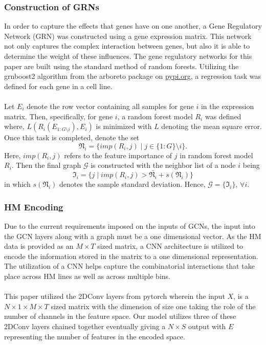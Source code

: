 \subsubsection{Construction of GRNs}
In order to capture the effects that genes have on one another, a Gene Regulatory Network (GRN) was constructed using a gene expression matrix. This network not only captures the complex interaction between genes, but also it is able to determine the weight of these influences. The gene regulatory networks for this paper are built using the standard method of random forests. Utilizing the grnboost2 algorithm from the arboreto package on \url{pypi.org}, a regression task was defined for each gene in a cell line. \\\\
Let $E_i$ denote the row vector containing all samples for gene $i$ in the expression matrix. Then, specifically, for gene $i$, a random forest model $R_i$ was defined where, $L(R_i(E_{1:G\setminus i}), E_i)$ is minimized with $L$ denoting the mean square error. Once this task is completed, denote the set 
\[\mathfrak{N}_i = \{imp(R_i, j) \mid j \in \{1:G\}\setminus i\}.\]
Here, $imp(R_i, j)$ refers to the feature importance of $j$ in random forest model $R_i$. Then the final graph $\mathcal{G}$ is constructed with the neighbor list of a node $i$ being 
\[\mathfrak{I}_i = \{j \mid imp(R_i, j) > \bar{\mathfrak{N}_i} + s(\mathfrak{N}_i)\}\]
in which $s(\mathfrak{N}_i)$ denotes the sample standard deviation. Hence, $\mathcal{G} = \{\mathfrak{I}_i\}$, $\forall i$.

\subsubsection{HM Encoding}
Due to the current requirements imposed on the inputs of GCNs, the input into the GCN layers along with a graph must be a one dimensional vector. As the HM data is provided as an $M\times T$ sized matrix, a CNN architecture is utilized to encode the information stored in the matrix to a one dimensional representation. The utilization of a CNN helps capture the combinatorial interactions that take place across HM lines as well as across multiple bins.\\\\
This paper utilized the 2DConv layers from pytorch wherein the input $X$, is a $N \times 1\times M\times T$ sized matrix with the dimension of size one taking the role of the number of channels in the feature space. Our model utilizes three of these 2DConv layers chained together eventually giving a $N \times S$ output with $E$ representing the number of features in the encoded space.

